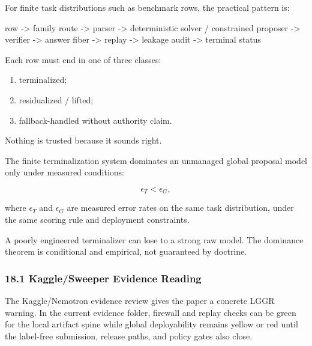 \documentclass[
  10pt,
]{article}
\newenvironment{Shaded}{}{}
\newcommand{\NormalTok}[1]{#1}
\providecommand{\tightlist}{%
  \setlength{\itemsep}{0pt}\setlength{\parskip}{0pt}}
\providecommand{\tightlist}{%
  \setlength{\itemsep}{0pt}\setlength{\parskip}{0pt}}
\begin{document}
For finite task distributions such as benchmark rows, the practical pattern is:

\begin{Shaded}
\begin{Highlighting}[]
\NormalTok{row}
\NormalTok{  {-}\textgreater{} family route}
\NormalTok{  {-}\textgreater{} parser}
\NormalTok{  {-}\textgreater{} deterministic solver / constrained proposer}
\NormalTok{  {-}\textgreater{} verifier}
\NormalTok{  {-}\textgreater{} answer fiber}
\NormalTok{  {-}\textgreater{} replay}
\NormalTok{  {-}\textgreater{} leakage audit}
\NormalTok{  {-}\textgreater{} terminal status}
\end{Highlighting}
\end{Shaded}

Each row must end in one of three classes:

\begin{enumerate}
\def\labelenumi{\arabic{enumi}.}
\tightlist
\item
  terminalized;
\item
  residualized / lifted;
\item
  fallback-handled without authority claim.
\end{enumerate}

Nothing is trusted because it sounds right.

The finite terminalization system dominates an unmanaged global proposal model only under measured conditions:

\protect\hypertarget{math-E0166-0227}{}{\[
\epsilon_T<\epsilon_G,
\]}

where \protect\hypertarget{math-E0167-0228}{}{\(\epsilon_T\)} and \protect\hypertarget{math-E0168-0229}{}{\(\epsilon_G\)} are measured error rates on the same task distribution, under the same scoring rule and deployment constraints.

A poorly engineered terminalizer can lose to a strong raw model. The dominance theorem is conditional and empirical, not guaranteed by doctrine.

\subsubsection{18.1 Kaggle/Sweeper Evidence Reading}\label{kagglesweeper-evidence-reading}

The Kaggle/Nemotron evidence review gives the paper a concrete LGGR warning. In the current evidence folder, firewall and replay checks can be green for the local artifact spine while global deployability remains yellow or red until the label-free submission, release paths, and policy gates also close.
\end{document}
